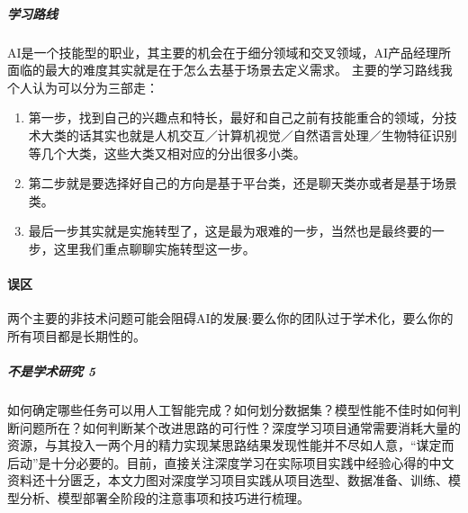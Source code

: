 \documentclass[letterpaper,11pt,english]{sphinxmanual}
\begin{document}
\subparagraph{学习路线}
\label{\detokenize{chapter_introduction/AI_PM:id26}}
AI是一个技能型的职业，其主要的机会在于细分领域和交叉领域，AI产品经理所面临的最大的难度其实就是在于怎么去基于场景去定义需求。
主要的学习路线我个人认为可以分为三部走：
\begin{enumerate}
%
\item {} 
第一步，找到自己的兴趣点和特长，最好和自己之前有技能重合的领域，分技术大类的话其实也就是人机交互／计算机视觉／自然语言处理／生物特征识别等几个大类，这些大类又相对应的分出很多小类。

\item {} 
第二步就是要选择好自己的方向是基于平台类，还是聊天类亦或者是基于场景类。

\item {} 
最后一步其实就是实施转型了，这是最为艰难的一步，当然也是最终要的一步，这里我们重点聊聊实施转型这一步。

\end{enumerate}


\paragraph{误区}
\label{\detokenize{chapter_introduction/AI_PM:id27}}
两个主要的非技术问题可能会阻碍AI的发展:要么你的团队过于学术化，要么你的所有项目都是长期性的。%
\begin{footnote}[252]\sphinxAtStartFootnote
{}
%
\end{footnote}


\subparagraph{不是学术研究 5\sphinxfootnotemark[253]}
\label{\detokenize{chapter_introduction/AI_PM:id28}}%
\begin{footnotetext}[253]\sphinxAtStartFootnote
{}
%
\end{footnotetext}\ignorespaces 
如何确定哪些任务可以用人工智能完成？如何划分数据集？模型性能不佳时如何判断问题所在？如何判断某个改进思路的可行性？深度学习项目通常需要消耗大量的资源，与其投入一两个月的精力实现某思路结果发现性能并不尽如人意，“谋定而后动”是十分必要的。目前，直接关注深度学习在实际项目实践中经验心得的中文资料还十分匮乏，本文力图对深度学习项目实践从项目选型、数据准备、训练、模型分析、模型部署全阶段的注意事项和技巧进行梳理。
\end{document}
